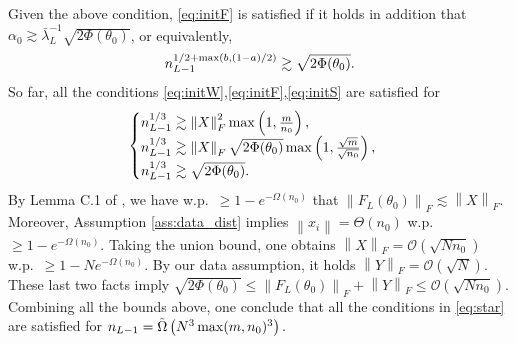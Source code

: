 \documentclass{article}
\newcommand{\bigTildeOmg}[1]{\tilde{\Omega}\left(#1\right)}
\newcommand{\norm}[1]{\left\|#1\right\|}
\def\max{\mathop{\rm max}\nolimits}
\begin{document}
    Given the above condition, \eqref{eq:initF} is satisfied if it holds in addition that
    $\alpha_0\gtrsim \bar{\lambda}_L^{-1} \sqrt{2\Phi(\theta_0)}$, or equivalently,
    \begin{align*}
	n_{L-1}^{1/2+\max(b,(1-a)/2)} \gtrsim \sqrt{2\Phi(\theta_0)} .
    \end{align*}
    So far, all the conditions \eqref{eq:initW},\eqref{eq:initF},\eqref{eq:initS} are satisfied for
    \begin{align}\label{eq:star}
	\begin{cases}
	    n_{L-1}^{1/3} \gtrsim\norm{X}_F^2 \max\left(1,\frac{m}{n_0}\right),\\
	    n_{L-1}^{1/3} \gtrsim\norm{X}_F\sqrt{2\Phi(\theta_0)} \max\left(1,\frac{\sqrt{m}}{\sqrt{n_0}}\right),\\
	    n_{L-1}^{1/3} \gtrsim\sqrt{2\Phi(\theta_0)} .
	\end{cases}
    \end{align}
    By Lemma C.1 of \cite{QuynhMarco2020}, we have w.p.\ $\geq 1-e^{-\Omega(n_0)}$ that
    $\norm{F_L(\theta_0)}_F\lesssim\norm{X}_F.$
    Moreover, Assumption \ref{ass:data_dist} implies $\norm{x_i}=\Theta(n_0)$ w.p.\ $\geq 1-e^{-\Omega(n_0)}.$
    Taking the union bound, one obtains $\norm{X}_F=\mathcal{O}(\sqrt{Nn_0})$ w.p.\ $\geq 1-Ne^{-\Omega(n_0)}.$  
    By our data assumption, it holds $\norm{Y}_F=\mathcal{O}(\sqrt{N})$. 
    These last two facts imply $\sqrt{2\Phi(\theta_0)}\leq \norm{F_L(\theta_0)}_F+\norm{Y}_F\leq\mathcal{O}(\sqrt{Nn_0}).$
    Combining all the bounds above, one conclude that all the conditions in \eqref{eq:star} are satisfied for $n_{L-1}=\bigTildeOmg{N^3\max(m,n_0)^3}.$

\end{document}
